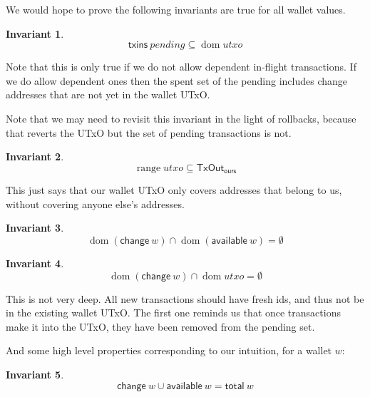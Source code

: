 \documentclass{article}
\DeclareMathOperator{\dom}{dom}
\DeclareMathOperator{\range}{range}
\newtheorem{invariant}{Invariant}
\begin{document}
We would hope to prove the following invariants are true for all wallet values.

\begin{invariant}
\begin{equation*}
\mathsf{txins} ~ pending \subseteq \dom utxo
\end{equation*}
\label{inv:txins_in_dom_utxo}
\end{invariant}

Note that this is only true if we do not allow dependent in-flight transactions.
If we do allow dependent ones then the spent set of the pending includes change
addresses that are not yet in the wallet UTxO.

Note that we may need to revisit this invariant in the light of rollbacks,
because that reverts the UTxO but the set of pending transactions is not.

\begin{invariant}
\begin{equation*}
\range utxo \subseteq \mathsf{TxOut_{ours}}
\end{equation*}
\label{inv:utxo_is_ours}
\end{invariant}

This just says that our wallet UTxO only covers addresses that belong to us,
without covering anyone else's addresses.

\begin{invariant}
\begin{equation*}
\dom (\mathsf{change} ~ w) \cap \dom (\mathsf{available} ~ w) = \emptyset
\end{equation*}
\label{inv:change_vs_available}
\end{invariant}

\begin{invariant}
\begin{equation*}
\dom (\mathsf{change} ~ w) \cap \dom utxo = \emptyset
\end{equation*}
\label{inv:change_vs_utxo}
\end{invariant}

This is not very deep. All new transactions should have fresh ids, and thus
not be in the existing wallet UTxO. The first one reminds us that once
transactions make it into the UTxO, they have been removed from the pending set.

And some high level properties corresponding to our intuition, for a wallet $w$:

\begin{invariant}
\begin{equation*}
\mathsf{change} ~ w \cup \mathsf{available} ~ w = \mathsf{total} ~ w
\end{equation*}
\label{inv:change_union_available}
\end{invariant}
\end{document}
